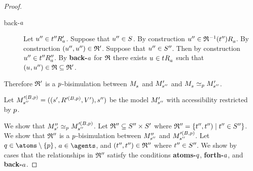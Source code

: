 \begin{proof}
\begin{description}
\begin{description}
            \item[back-$\agentA$]
                Let $\kStateUPP \in \kSuccessorsPA{\kStateTPP}$.
                Suppose that $\kStateUPP \in \kStates$.
                By construction $\kStateUPP \in \kSuccessorsA{\refinement^{-1}(\kStateTPP)}$.
                By construction $(\kStateUPP, \kStateUPP) \in \bisimulation'$.
                Suppose that $\kStateUPP \in \kStatesPP$.
                Then by construction $\kStateUPP \in \kSuccessorsPPA{\kStateTPP}$.
                By {\bf back-$\agentA$} for $\refinement$ there exists $\kStateU \in \kSuccessorsA{\kStateT}$ such that $(\kStateU, \kStateUPP) \in \refinement \subseteq \bisimulation'$.
        \end{description}
\end{description}

Therefore $\bisimulation'$ is a $\atomP$-bisimulation between $\kPModel{\kStateS}$ and $\kPModelP{\kStateSPP}$ and $\kPModel{\kStateS} \bisimilar[\atomP] \kPModelP{\kStateSPP}$.

Let $\kPModel[\prime(\agentsB, \atomP)]{\kStateSPP} = ((\kStateSP, \kAccessibility[\prime(\agentsB, \atomP)]{}, \kValuationP), \kStateSPP)$ be the model $\kPModelP{\kStateSPP}$ with accessibility restricted by $\atomP$.

We show that $\kPModelPP{\kStateSP} \bisimilar[\atomP] \kPModel[\prime(\agentsB, \atomP)]{\kStateSPP}$.
Let $\bisimulation'' \subseteq \kStatesPP \times \kStatesP$ where $\bisimulation'' = \{\kStateTPP, \kStateTPP) \mid \kStateTPP \in \kStatesPP\}$.
We show that $\bisimulation''$ is a $\atomP$-bisimulation between $\kPModelPP{\kStateSPP}$ and $\kPModel[\prime(\agentsB, \atomP)]{\kStateSPP}$.
Let $\atomQ \in \atoms \setminus \{\atomP\}$, $\agentA \in \agents$, and $(\kStateTPP, \kStateTPP) \in \bisimulation''$ where $\kStateTPP \in \kStatesPP$.
We show by cases that the relationships in $\bisimulation''$ satisfy the conditions {\bf atoms-$\atomQ$}, {\bf forth-$\agentA$}, and {\bf back-$\agentA$}.


\end{proof}
